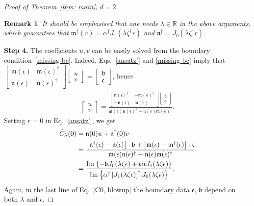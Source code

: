\documentclass[11pt,a4paper,english,reqno]{amsart}
\theoremstyle{plain}
\newtheorem{remark}[definition]{Remark}
\newcommand{\R}{\mathbb{R}}
\newcommand{\e}{\epsilon}
\newcommand{\1}{\mathbbm{1}}
\newcommand{\bb}{{\mathfrak{b}}}
\newcommand{\mm}{{\mathfrak{m}}}
\newcommand{\nn}{{\mathfrak{n}}}
\begin{document}
\begin{proof}[Proof of Theorem~\ref{thm: main}, $d=2$]
\begin{remark}
It should be emphasised that one needs $\lambda \in \R$ in the above arguments, which guarantees that $\mm^\dagger(r)=\alpha^\dagger J_1\left(\lambda \zeta^\dagger r\right)$ and $\nn^\dagger = J_0\left(\lambda\zeta^\dagger r\right)$.
\end{remark}

\smallskip
\noindent
{\bf Step 4.} The coefficients $u,v$ can be  easily solved from the boundary condition~\eqref{missing bc}. Indeed, Eqs.~\eqref{ansatz'} and \eqref{missing bc} imply that $
\begin{bmatrix}
\mm(\e)&\mm(\e)^\dagger\\
\nn(\e)&\nn(\e)^\dagger
\end{bmatrix}\begin{bmatrix}
u\\
v
\end{bmatrix}=\begin{bmatrix}
\bb\\
\mathfrak{c}
\end{bmatrix}$,
hence
\begin{align*}
\begin{bmatrix}
u\\
v
\end{bmatrix} = \frac{\begin{bmatrix}
\nn(\e)^\dagger&-\mm(\e)^\dagger\\
-\nn(\e)&\mm(\e)
\end{bmatrix}\begin{bmatrix}
\bb\\
\mathfrak{c}
\end{bmatrix}}{\mm(\e) \nn(\e)^\dagger-\nn(\e)\mm(\e)^\dagger}.
\end{align*} Setting $r=0$ in Eq.~\eqref{ansatz'}, we get
\begin{align}\label{C0, blowup}
\bar{C}_\lambda(0)&=\nn(0) u + \nn^\dagger(0)v\nonumber\\
&= \frac{\left[\nn^\dagger(\e)-\nn(\e)\right]\cdot \bb + \left[\mm(\e)-\mm^\dagger(\e)\right]\cdot\mathfrak{c}}{\mm(\e) \nn(\e)^\dagger-\nn(\e)\mm(\e)^\dagger}\nonumber\\
&= \frac{{\rm Im}\left\{-\bb J_0(\lambda\zeta\e)+\mathfrak{c}\alpha J_1(\lambda\zeta\e)\right\}}{{\rm Im}\left\{ \alpha^\dagger \left[J_1(\lambda\zeta \e)\right]^\dagger J_0(\lambda\zeta\e) \right\}}.
\end{align}
Again, in the last line of Eq.~\eqref{C0, blowup} the boundary data $\mathfrak{c}$, $\bb$ depend on both $\lambda$ and $\e$. 



\end{proof}
\end{document}
